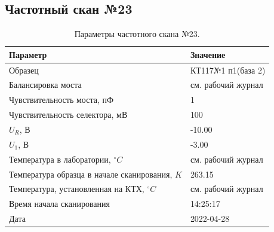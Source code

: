 \subsection{Частотный скан №23}
\begin{table}[!ht]
    \centering
    \caption{Параметры частотного скана №23.}
    \begin{tabular}{|l|l|}
        \hline
        Параметр                                       & Значение                  \\ \hline
        Образец                                        & КТ117№1 п1(база 2)        \\ \hline
        Балансировка моста                             & см. рабочий журнал        \\ \hline
        Чувствительность моста, пФ                     & 1                         \\ \hline
        Чувствительность селектора, мВ                 & 100                       \\ \hline
        $U_R$, В                                       & -10.00                    \\ \hline
        $U_1$, В                                       & -3.00                     \\ \hline
        Температура в лаборатории, $^\circ C$          & см. рабочий журнал        \\ \hline
        Температура образца в начале сканирования, $K$ & 263.15                    \\ \hline
        Температура, установленная на КТХ, $^\circ C$  & см. рабочий журнал        \\ \hline
        Время начала сканирования                      & 14:25:17                  \\ \hline
        Дата                                           & 2022-04-28                \\ \hline
    \end{tabular}
    \label{table:frequency_scan_23}
\end{table}

